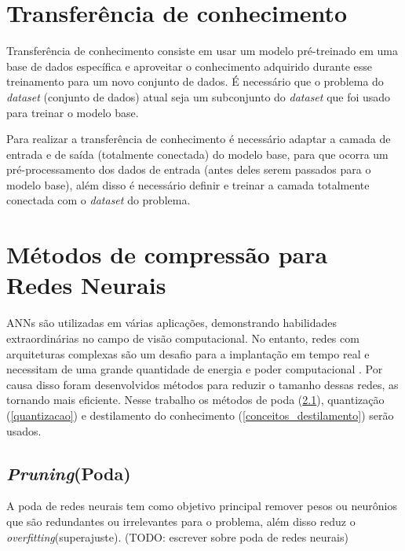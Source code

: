 \section{Transferência de conhecimento}\label{conceitos_transferencia}
Transferência de conhecimento consiste em usar um modelo pré-treinado em uma base de dados específica e aproveitar
o conhecimento adquirido durante esse treinamento para um novo conjunto de dados.
É necessário que o problema do \textit{dataset} (conjunto de dados) atual seja um subconjunto do \textit{dataset}
que foi usado para treinar o modelo base.

Para realizar a transferência de conhecimento é necessário adaptar a camada de entrada e de saída
(totalmente conectada) do modelo base, para que ocorra um pré-processamento dos dados de entrada
(antes deles serem passados para o modelo base), além disso é necessário definir e treinar a camada totalmente
conectada com o \textit{dataset} do problema.

\section{Métodos de compressão para Redes Neurais}
ANNs são utilizadas em várias aplicações, demonstrando habilidades extraordinárias no campo de visão computacional.
No entanto, redes com arquiteturas complexas são um desafio para a implantação em tempo real e necessitam de uma
grande quantidade de energia e poder computacional \cite{LIANG2021370}.
Por causa disso foram desenvolvidos métodos para reduzir o tamanho dessas redes, as tornando mais eficiente.
Nesse trabalho os métodos de poda (\ref{poda}), quantização (\ref{quantizacao}) e destilamento do conhecimento
(\ref{conceitos_destilamento}) serão usados.

\subsection{\textit{Pruning}(Poda)}\label{poda}
A poda de redes neurais tem como objetivo principal remover pesos ou neurônios que são
redundantes ou irrelevantes para o problema, além disso reduz o \textit{overfitting}(superajuste).
(TODO: escrever sobre poda de redes neurais)


